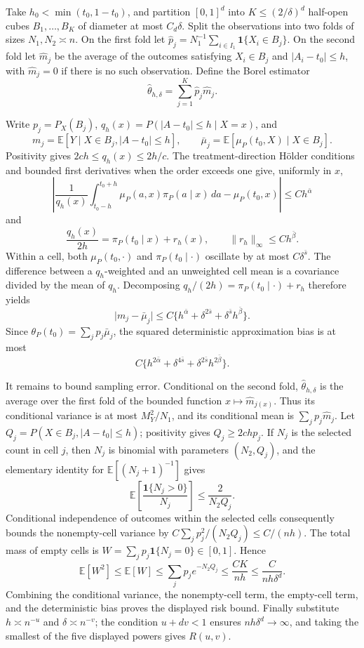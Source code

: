 Take \(h_0<\min(t_0,1-t_0)\), and partition \([0,1]^d\) into \(K\le(2/\delta)^d\) half-open cubes \(B_1,\ldots,B_K\) of diameter at most \(C_d\delta\). Split the observations into two folds of sizes \(N_1,N_2\asymp n\). On the first fold let \(\widehat p_j=N_1^{-1}\sum_{i\in I_1}\mathbf 1\{X_i\in B_j\}\). On the second fold let \(\widehat m_j\) be the average of the outcomes satisfying \(X_i\in B_j\) and \(\lvert A_i-t_0\rvert\le h\), with \(\widehat m_j=0\) if there is no such observation. Define the Borel estimator \[\widehat\theta_{h,\delta}=\sum_{j=1}^K\widehat p_j\widehat m_j.\]

Write \(p_j=P_X(B_j)\), \(q_h(x)=P(\lvert A-t_0\rvert\le h\mid X=x)\), and \[m_j=\mathbb E[Y\mid X\in B_j,\lvert A-t_0\rvert\le h],\qquad \bar\mu_j=\mathbb E[\mu_P(t_0,X)\mid X\in B_j].\] Positivity gives \(2ch\le q_h(x)\le2h/c\). The treatment-direction Hölder conditions and bounded first derivatives when the order exceeds one give, uniformly in \(x\), \[\left\lvert\frac{1}{q_h(x)}\int_{t_0-h}^{t_0+h}\mu_P(a,x)\pi_P(a\mid x)\,da-\mu_P(t_0,x)\right\rvert\le C h^{\bar\alpha}\] and \[\frac{q_h(x)}{2h}=\pi_P(t_0\mid x)+r_h(x),\qquad \lVert r_h\rVert_\infty\le C h^{\bar\beta}.\] Within a cell, both \(\mu_P(t_0,\cdot)\) and \(\pi_P(t_0\mid\cdot)\) oscillate by at most \(C\delta^{\bar s}\). The difference between a \(q_h\)-weighted and an unweighted cell mean is a covariance divided by the mean of \(q_h\). Decomposing \(q_h/(2h)=\pi_P(t_0\mid\cdot)+r_h\) therefore yields \[\lvert m_j-\bar\mu_j\rvert\le C\{h^{\bar\alpha}+\delta^{2\bar s}+\delta^{\bar s}h^{\bar\beta}\}.\] Since \(\theta_P(t_0)=\sum_jp_j\bar\mu_j\), the squared deterministic approximation bias is at most \[C\{h^{2\bar\alpha}+\delta^{4\bar s}+\delta^{2\bar s}h^{2\bar\beta}\}.\]

It remains to bound sampling error. Conditional on the second fold, \(\widehat\theta_{h,\delta}\) is the average over the first fold of the bounded function \(x\mapsto\widehat m_{j(x)}\). Thus its conditional variance is at most \(M_Y^2/N_1\), and its conditional mean is \(\sum_jp_j\widehat m_j\). Let \(Q_j=P(X\in B_j,\lvert A-t_0\rvert\le h)\); positivity gives \(Q_j\ge2chp_j\). If \(N_j\) is the selected count in cell \(j\), then \(N_j\) is binomial with parameters \((N_2,Q_j)\), and the elementary identity for \(\mathbb E[(N_j+1)^{-1}]\) gives \[\mathbb E\!\left[\frac{\mathbf 1\{N_j>0\}}{N_j}\right]\le\frac{2}{N_2Q_j}.\] Conditional independence of outcomes within the selected cells consequently bounds the nonempty-cell variance by \(C\sum_jp_j^2/(N_2Q_j)\le C/(nh)\). The total mass of empty cells is \(W=\sum_jp_j\mathbf 1\{N_j=0\}\in[0,1]\). Hence \[\mathbb E[W^2]\le\mathbb E[W]\le\sum_jp_j e^{-N_2Q_j}\le \frac{CK}{nh}\le\frac{C}{nh\delta^d}.\] Combining the conditional variance, the nonempty-cell term, the empty-cell term, and the deterministic bias proves the displayed risk bound. Finally substitute \(h\asymp n^{-u}\) and \(\delta\asymp n^{-v}\); the condition \(u+dv<1\) ensures \(nh\delta^d\to\infty\), and taking the smallest of the five displayed powers gives \(R(u,v)\).